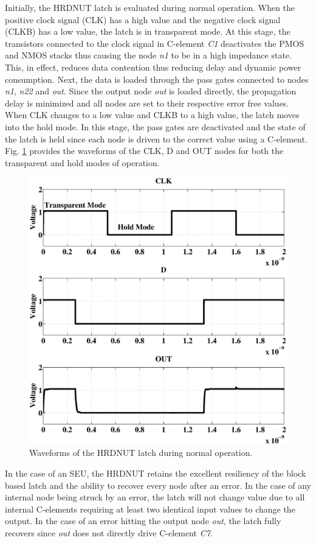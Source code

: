 Initially, the HRDNUT latch is evaluated during normal operation. When the positive clock signal (CLK) has a high value and the negative clock signal (CLKB) has a low value, the latch is in transparent mode. At this stage, the transistors connected to the clock signal in C-element \textit{C1} deactivates the PMOS and NMOS stacks thus causing the node \textit{n1} to be in a high impedance state. This, in effect, reduces data contention thus reducing delay and dynamic power consumption. Next, the data is loaded through the pass gates connected to nodes \textit{n1}, \textit{n22} and \textit{out}. Since the output node \textit{out} is loaded directly, the propagation delay is minimized and all nodes are set to their respective error free values. When CLK changes to a low value and CLKB to a high value, the latch moves into the hold mode. In this stage, the pass gates are deactivated and the state of the latch is held since each node is driven to the correct value using a C-element. Fig. \ref{NormOp} provides the waveforms of the CLK, D and OUT nodes for both the transparent and hold modes of operation.

\begin{figure}[!htbp]
	\centering
	\includegraphics[width=0.65\linewidth]{Figures/defaultoperation.eps}
	\caption{Waveforms of the HRDNUT latch during normal operation.}
	\label{NormOp}
\end{figure}

In the case of an SEU, the HRDNUT retains the excellent resiliency of the block based latch and the ability to recover every node after an error. In the case of any internal node being struck by an error, the latch will not change value due to all internal C-elements requiring at least two identical input values to change the output. In the case of an error hitting the output node \textit{out}, the latch fully recovers since \textit{out} does not directly drive C-element \textit{C7}.

